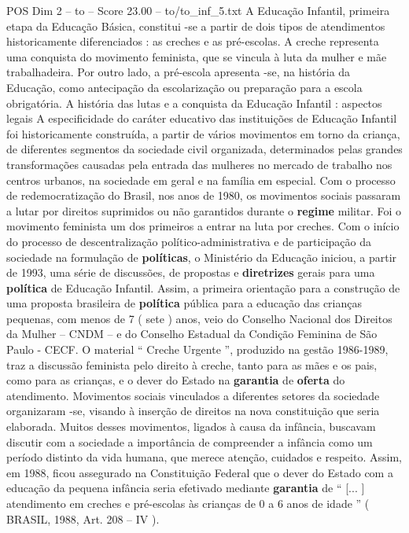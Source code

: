 \begin{textsample}{POS Dim 2 – to – Score 23.00 – to/to\_inf\_5.txt}  \label{ex:f2_pos_137}
A Educação Infantil, primeira etapa da Educação Básica, constitui -se a partir de dois tipos de atendimentos historicamente diferenciados : as creches e as pré-escolas.
A creche representa uma conquista do movimento feminista, que se vincula à luta da mulher e mãe trabalhadeira.
Por outro lado, a pré-escola apresenta -se, na história da Educação, como antecipação da escolarização ou preparação para a escola obrigatória.
A história das lutas e a conquista da Educação Infantil : aspectos legais A especificidade do caráter educativo das instituições de Educação Infantil foi historicamente construída, a partir de vários movimentos em torno da criança, de diferentes segmentos da sociedade civil organizada, determinados pelas grandes transformações causadas pela entrada das mulheres no mercado de trabalho nos centros urbanos, na sociedade em geral e na família em especial.
Com o processo de redemocratização do Brasil, nos anos de 1980, os movimentos sociais passaram a lutar por direitos suprimidos ou não garantidos durante o \textbf{regime} militar.
Foi o movimento feminista um dos primeiros a entrar na luta por creches.
Com o início do processo de descentralização político-administrativa e de participação da sociedade na formulação de \textbf{políticas}, o Ministério da Educação iniciou, a partir de 1993, uma série de discussões, de propostas e \textbf{diretrizes} gerais para uma \textbf{política} de Educação Infantil.
Assim, a primeira orientação para a construção de uma proposta brasileira de \textbf{política} pública para a educação das crianças pequenas, com menos de 7 ( sete ) anos, veio do Conselho Nacional dos Direitos da Mulher – CNDM – e do Conselho Estadual da Condição Feminina de São Paulo - CECF.
O material “ Creche Urgente ”, produzido na gestão 1986-1989, traz a discussão feminista pelo direito à creche, tanto para as mães e os pais, como para as crianças, e o dever do Estado na \textbf{garantia} de \textbf{oferta} do atendimento.
Movimentos sociais vinculados a diferentes setores da sociedade organizaram -se, visando à inserção de direitos na nova constituição que seria elaborada.
Muitos desses movimentos, ligados à causa da infância, buscavam discutir com a sociedade a importância de compreender a infância como um período distinto da vida humana, que merece atenção, cuidados e respeito.
Assim, em 1988, ficou assegurado na Constituição Federal que o dever do Estado com a educação da pequena infância seria efetivado mediante \textbf{garantia} de “ [... ] atendimento em creches e pré-escolas às crianças de 0 a 6 anos de idade ” ( BRASIL, 1988, Art. 208 – IV ).

\end{textsample}
